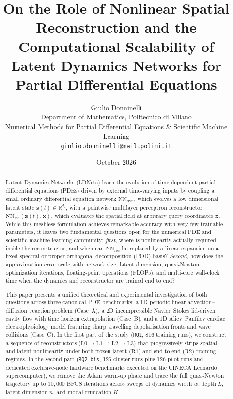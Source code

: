 \documentclass[10pt,a4paper]{article}
\title{\textbf{On the Role of Nonlinear Spatial Reconstruction and the Computational Scalability of Latent Dynamics Networks for Partial Differential Equations}}
\author{
  Giulio Donninelli\\
  \small Department of Mathematics, Politecnico di Milano\\
  \small Numerical Methods for Partial Differential Equations \& Scientific Machine Learning\\
  \small \texttt{giulio.donninelli@mail.polimi.it}
}
\date{October 2026}
\newcommand{\NNdyn}{\mathrm{NN}_{\mathrm{dyn}}}
\newcommand{\NNrec}{\mathrm{NN}_{\mathrm{rec}}}
\newcommand{\R}{\mathbb{R}}
\begin{document}
\maketitle

\begin{abstract}
Latent Dynamics Networks (LDNets) learn the evolution of time-dependent partial differential equations (PDEs) driven by external time-varying inputs by coupling a small ordinary differential equation network $\NNdyn$, which evolves a low-dimensional latent state $\mathbf{s}(t)\in\R^{d_s}$, with a pointwise multilayer perceptron reconstructor $\NNrec(\mathbf{z}(t),\mathbf{x})$, which evaluates the spatial field at arbitrary query coordinates $\mathbf{x}$. While this meshless formulation achieves remarkable accuracy with very few trainable parameters, it leaves two fundamental questions open for the numerical PDE and scientific machine learning community: \emph{first}, where is nonlinearity actually required inside the reconstructor, and when can $\NNrec$ be replaced by a linear expansion on a fixed spectral or proper orthogonal decomposition (POD) basis? \emph{Second}, how does the approximation error scale with network size, latent dimension, quasi-Newton optimization iterations, floating-point operations (FLOPs), and multi-core wall-clock time when the dynamics and reconstructor are trained end to end?

This paper presents a unified theoretical and experimental investigation of both questions across three canonical PDE benchmarks: a 1D periodic linear advection--diffusion--reaction problem (Case~A), a 2D incompressible Navier--Stokes lid-driven cavity flow with time horizon extrapolation (Case~B), and a 1D Aliev--Panfilov cardiac electrophysiology model featuring sharp travelling depolarisation fronts and wave collisions (Case~C). In the first part of the study (\texttt{RQ2}, 816 training runs), we construct a sequence of reconstructors ($\mathrm{L0}\to\mathrm{L1}\to\mathrm{L2}\to\mathrm{L3}$) that progressively strips spatial and latent nonlinearity under both frozen-latent ($\mathrm{R1}$) and end-to-end ($\mathrm{R2}$) training regimes. In the second part (\texttt{RQ2-bis}, 126 cluster runs plus 126 pilot runs and dedicated exclusive-node hardware benchmarks executed on the CINECA Leonardo supercomputer), we remove the Adam warm-up phase and trace the full quasi-Newton trajectory up to $10{,}000$ BFGS iterations across sweeps of dynamics width $w$, depth $L$, latent dimension $n$, and modal truncation $K$.


\end{abstract}
\end{document}
